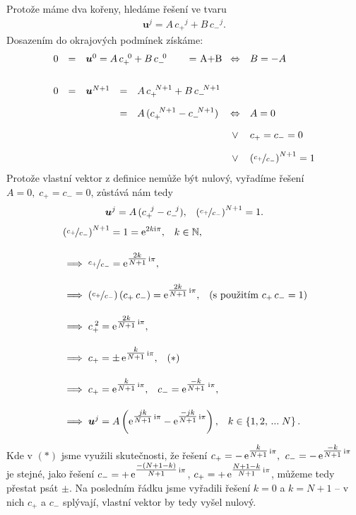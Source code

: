 \documentclass[10pt,a4paper]{article}
\newcommand{\const}[1]{\text{\rmfamily\upshape #1}}
\newcommand{\e}[1]{\const{e}^{#1}}
\renewcommand{\i}{\const{i}}
\begin{document}
Protože máme dva kořeny, hledáme řešení ve tvaru
\begin{align*}
    \bm{u}^j = A \, {c_{+}}^j + B \, {c_{-}}^j.
\end{align*}
Dosazením do okrajových podmínek získáme:
\begin{equation*}
\begin{array}{rclclcl}
    0 &=& \multicolumn{3}{l}{\bm{u}^0 = A \, c_{+}^{\;\;0} + B \, c_{-}^{\;\;0}} = A+B &\Leftrightarrow& B = -A
    \\[20pt]
    0 &=& \bm{u}^{N+1} &=& A \, c_{+}^{\;\;N+1} + B \, c_{-}^{\;\;N+1}
    \\[10pt]
    & & &=& A \, (c_{+}^{\;\;N+1} - c_{-}^{\;\;N+1})
    &\Leftrightarrow& A = 0 \\[10pt]
    & & & & &\vee& c_{+} = c_{-} = 0 \\[10pt]
    & & & & &\vee& \left(\nicefrac{c_{+}}{c_{-}}\right)^{N+1} = 1
\end{array}
\end{equation*}
Protože vlastní vektor z definice nemůže být nulový, vyřadíme řešení $A=0, \; c_{+} = c_{-} = 0$, zůstává nám tedy
\begin{align*}
    \bm{u}^j = A \, (c_{+}^{\;\;j} - c_{-}^{\;\;j}), \;\;\;
    \left(\nicefrac{c_{+}}{c_{-}}\right)^{N+1} = 1. \\
\end{align*}
\begin{align*}
    &\left(\nicefrac{c_{+}}{c_{-}}\right)^{N+1} = 1 = \e{2k\i\pi}, \;\;\; k\in\mathbb{N},
    \\[10pt]
    &\implies \nicefrac{c_{+}}{c_{-}} = \e{\tfrac{2k}{N+1}\,\i\pi},
    \\[10pt]
    &\implies \left( \nicefrac{c_{+}}{c_{-}} \right) \left( c_{+}\,c_{-} \right) =  \e{\tfrac{2k}{N+1}\, \i\pi},
    \;\;\; \text{(s použitím }c_{+}\,c_{-}=1\text{)}
    \\[10pt]
    &\implies c_{+}^{\;2} = \e{\tfrac{2k}{N+1}\, \i\pi},
    \\[10pt]
    &\implies c_{+} = \pm \, \e{\tfrac{k}{N+1}\, \i\pi},
    \;\;\; (*)
    \\[10pt]
    &\implies c_{+} = \e{\tfrac{k}{N+1}\, \i\pi},
    \;\;\; c_{-} = \e{\tfrac{-k}{N+1}\; \i\pi},
    \\[10pt]
    &\implies \bm{u}^j = A \left( \e{\tfrac{jk}{N+1}\, \i\pi} - \e{\tfrac{-jk}{N+1}\, \i\pi} \right),
    \;\;\; k \in \left\{ 1, 2, \, ... \; N \right\}.
\end{align*}
\begin{spacing}{1.9}
\noindent
Kde v $(*)$ jsme využili skutečnosti, že řešení ${c_{+} = - \, \e{\tfrac{k}{N+1}\, \i\pi},} \;\; {c_{-} =  - \, \e{\tfrac{-k}{N+1}\, \i\pi}}$ je stejné, jako řešení ${c_{-} = + \, \e{\tfrac{-(N+1-k)}{N+1} \, \i\pi}}$, ${c_{+} = +\, \e{\tfrac{N+1-k}{N+1} \, \i\pi}}$, můžeme tedy přestat psát $\pm$. Na posledním řádku jsme vyřadili řešení $k=0$ a $k=N+1$ – v nich $c_{+}$ a $c_{-}$ splývají, vlastní vektor by tedy vyšel nulový.
\end{spacing}
\end{document}
